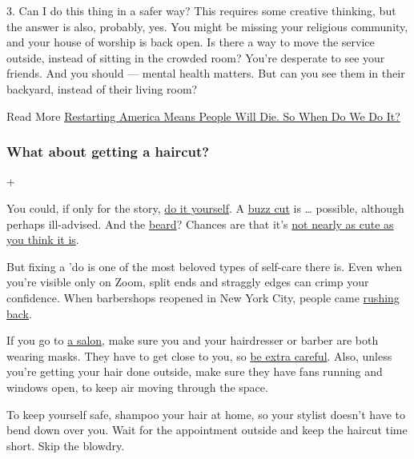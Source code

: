 3. Can I do this thing in a safer way? This requires some creative
thinking, but the answer is also, probably, yes. You might be missing
your religious community, and your house of worship is back open. Is
there a way to move the service outside, instead of sitting in the
crowded room? You're desperate to see your friends. And you should ---
mental health matters. But can you see them in their backyard, instead
of their living room?

 Read More
\href{https://www.nytimes3xbfgragh.onion/2020/04/10/magazine/coronavirus-economy-debate.html}{Restarting
America Means People Will Die. So When Do We Do It?}

\hypertarget{what-about-getting-a-haircut}{%
\subsubsection{What about getting a
haircut?}\label{what-about-getting-a-haircut}}

+

You could, if only for the story,
\href{https://www.nytimes3xbfgragh.onion/wirecutter/reviews/how-to-cut-your-own-hair/}{do
it yourself}. A
\href{https://www.nytimes3xbfgragh.onion/2020/04/15/style/self-care/buzz-cut-your-own-hair.html}{buzz
cut} is \ldots{} possible, although perhaps ill-advised. And the
\href{https://www.nytimes3xbfgragh.onion/2020/04/21/smarter-living/maybe-consider-shaving-that-pandemic-beard.html}{beard}?
Chances are that it's
\href{https://www.nytimes3xbfgragh.onion/2020/07/03/at-home/coronavirus-beards.html}{not
nearly as cute as you think it is}.

But fixing a 'do is one of the most beloved types of self-care there is.
Even when you're visible only on Zoom, split ends and straggly edges can
crimp your confidence. When barbershops reopened in New York City,
people came
\href{https://www.nytimes3xbfgragh.onion/2020/06/25/nyregion/nyc-barber-shops-coronavirus.html}{rushing
back}.

If you go to
\href{https://www.nytimes3xbfgragh.onion/2020/06/12/fashion/haircut-salon-reopening.html}{a
salon}, make sure you and your hairdresser or barber are both wearing
masks. They have to get close to you, so
\href{https://www.nytimes3xbfgragh.onion/2020/05/06/style/coronavirus-haircuts-barbers.html}{be
extra careful}. Also, unless you're getting your hair done outside, make
sure they have fans running and windows open, to keep air moving through
the space.

To keep yourself safe, shampoo your hair at home, so your stylist
doesn't have to bend down over you. Wait for the appointment outside and
keep the haircut time short. Skip the blowdry.


